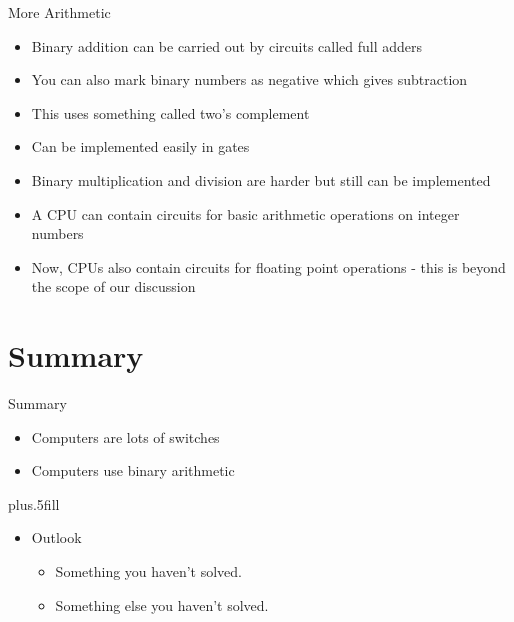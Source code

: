 \documentclass{beamer}
\begin{document}
\begin{frame}{More Arithmetic}
  \begin{itemize}
  \item
    Binary addition can be carried out by circuits called full adders
  \item
    You can also mark binary numbers as negative which gives subtraction
  \item
    This uses something called two's complement
  \item
    Can be implemented easily in gates
  \item
    Binary multiplication and division are harder but still can be implemented
  \item
    A CPU can contain circuits for basic arithmetic operations on integer numbers
  \item
    Now, CPUs also contain circuits for floating point operations - this is beyond the scope of our discussion
  \end{itemize}
\end{frame}


\section{Summary}

\begin{frame}{Summary}

  \begin{itemize}
  \item
    Computers are \alert{lots of switches}
  \item
    Computers use \alert{binary arithmetic}
  \end{itemize}
  
  \vskip0pt plus.5fill
  \begin{itemize}
  \item
    Outlook
    \begin{itemize}
    \item
      Something you haven't solved.
    \item
      Something else you haven't solved.
    \end{itemize}
  \end{itemize}
\end{frame}
\end{document}
